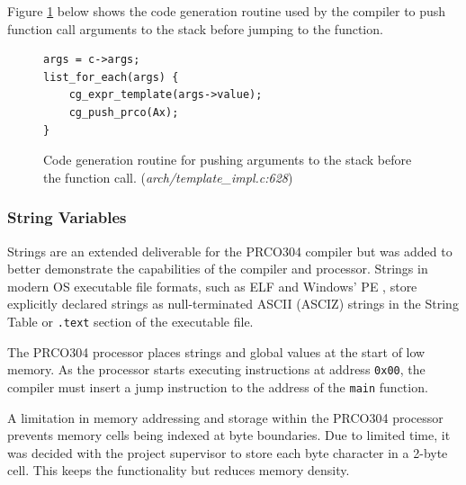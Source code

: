 \documentclass[11pt,a4paper]{report}
\newcommand{\scname}{PRCO304}
\begin{document}
Figure \ref{fig:compiler_cg_vars_args} below shows the code generation routine used by the compiler to push function call arguments to the stack before jumping to the function.

\begin{figure}[H]
\centering 
\begin{minipage}{0.4\textwidth}
\begin{verbatim}
args = c->args;
list_for_each(args) {
    cg_expr_template(args->value);
    cg_push_prco(Ax);
}
\end{verbatim}
\end{minipage}
\caption{Code generation routine for pushing arguments to the stack before the function call. (\textit{arch/template\_impl.c:628})}
\label{fig:compiler_cg_vars_args}
\end{figure}


\subsubsection*{String Variables}
Strings are an extended deliverable for the \scname{} compiler but was added to better demonstrate the capabilities of the compiler and processor. Strings in modern OS executable file formats, such as ELF \cite{elf_standard} and Windows' PE \cite {winpe_standard}, store explicitly declared strings as null-terminated ASCII (ASCIZ) strings in the String Table or \verb|.text| section of the executable file.

The \scname{} processor places strings and global values at the start of low memory. As the processor starts executing instructions at address \verb|0x00|, the compiler must insert a jump instruction to the address of the \verb|main| function.

A limitation in memory addressing and storage within the \scname{} processor prevents memory cells being indexed at byte boundaries. Due to limited time, it was decided with the project supervisor to store each byte character in a 2-byte cell. This keeps the functionality but reduces memory density.
\end{document}
